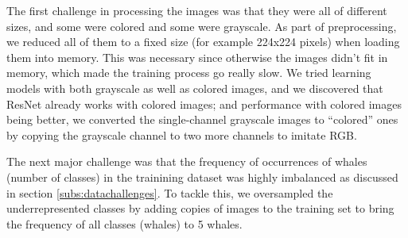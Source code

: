 The first challenge in processing the images was that they were all of different sizes, and some were colored and some were grayscale. As part of preprocessing, we reduced all of them to a fixed size (for example 224x224 pixels) when loading them into memory. This was necessary since otherwise the images didn't fit in memory, which made the training process go really slow. We tried learning models with both grayscale as well as colored images, and we discovered that ResNet already works with colored images; and performance with colored images being better, we converted the single-channel grayscale images to ``colored'' ones by copying the grayscale channel to two more channels to imitate RGB.

The next major challenge was that the frequency of occurrences of whales (number of classes) in the trainining dataset was highly imbalanced as discussed in section \ref{subs:datachallenges}. To tackle this, we oversampled the underrepresented classes by adding copies of images to the training set to bring the frequency of all classes (whales) to 5 whales.